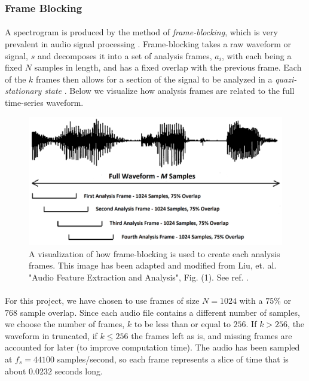 \documentclass[12pt,letterpaper]{article}
\begin{document}
\subsubsection{Frame Blocking}
\label{subsubsec-FrameBlocking}

\paragraph*{}A spectrogram is produced by the method of \textit{frame-blocking}, which is very prevalent in audio signal processing \cite{Liu,Zhang}. Frame-blocking takes a raw waveform or signal, $s$ and decomposes it into a set of analysis frames, $a_i$, with each being a fixed $N$ samples in length, and has a fixed overlap with the previous frame. Each of the $k$ frames then allows for a section of the signal to be analyzed in a \textit{quazi-stationary state} \cite{Khan,Serizel}. Below we visualize how analysis frames are related to the full time-series waveform. 

\begin{figure}[H]
\begin{center}
\includegraphics[scale=0.45]{../Figures/AnalysisFrames}
\end{center}
\caption{A visualization of how frame-blocking is used to create each analysis frames. This image has been adapted and modified from Liu, et. al. "Audio Feature Extraction and Analysis", Fig. (1). See ref. \cite{Liu}.}
\label{fig-AnalysisFrames}
\end{figure}

\paragraph*{}For this project, we have chosen to use frames of size $N = 1024$ with a $75\%$ or $768$ sample overlap. Since each audio file contains a different number of samples, we choose the number of frames, $k$ to be less than or equal to $256$. If $k > 256$, the waveform in truncated, if $k \leq 256$ the frames left as is, and missing frames are accounted for later (to improve computation time). The audio has been sampled at $f_s = 44100$ samples/second, so each frame represents a slice of time that is about $0.0232$ seconds long.
\end{document}
